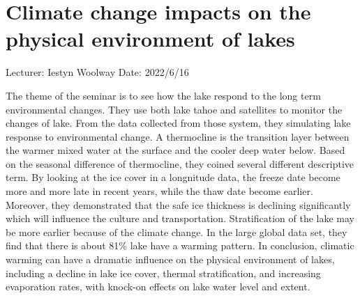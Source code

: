 \documentclass[11pt]{article}
\begin{document}
\section{Climate change impacts on the physical environment of lakes }
Lecturer: Iestyn Woolway
\newline
Date: 2022/6/16
\newline

The theme of the seminar is to see how the lake respond to the long term environmental changes. They use both lake tahoe and satellites to monitor the changes of lake. From the data collected from those system, they simulating lake response to environmental change. A thermocline is the transition layer between the warmer mixed water at the surface and the cooler deep water below. 
Based on the seasonal difference of thermocline, they coined several different descriptive term.
By looking at the ice cover in a longnitude data, the freeze date become more and more late in recent years, while the thaw date become earlier. Moreover, they demonstrated that the safe ice thickness is declining significantly which will influence the culture and transportation. Stratification of the lake may be more earlier because of the climate change. In the large global data set, they find that there is about 81\% lake have a warming pattern. In conclusion,
climatic warming can have a dramatic influence on the physical environment of lakes, including a decline in lake ice cover, thermal stratification, and increasing evaporation rates, with knock-on effects on lake water level and extent.

\newpage
\end{document}
